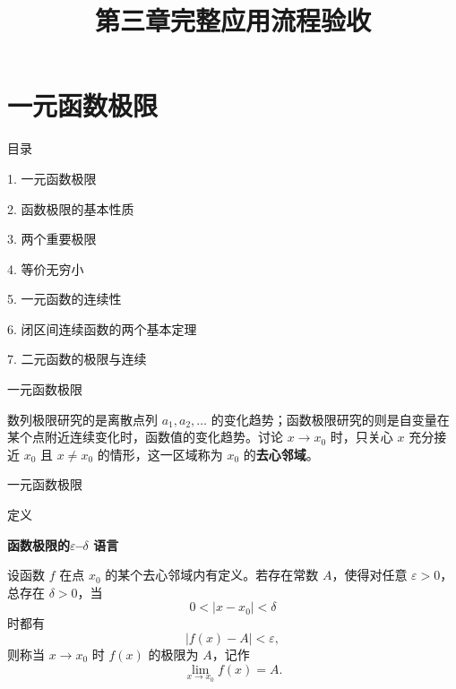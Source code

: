 \documentclass[aspectratio=169,10pt,fontset=fandol]{ctexbeamer}
\title{第三章完整应用流程验收}
\begin{document}
\section{一元函数极限}
\begin{frame}[t,fragile]{目录}
\normalsize
{\color{blue}\normalsize 1. 一元函数极限\par}\vspace{0.22em}
{\color{gray!40}\normalsize 2. 函数极限的基本性质\par}\vspace{0.22em}
{\color{gray!40}\normalsize 3. 两个重要极限\par}\vspace{0.22em}
{\color{gray!40}\normalsize 4. 等价无穷小\par}\vspace{0.22em}
{\color{gray!40}\normalsize 5. 一元函数的连续性\par}\vspace{0.22em}
{\color{gray!40}\normalsize 6. 闭区间连续函数的两个基本定理\par}\vspace{0.22em}
{\color{gray!40}\normalsize 7. 二元函数的极限与连续\par}\vspace{0.22em}
\end{frame}
\begin{frame}[t,fragile]{一元函数极限}
\normalsize
{\normalsize
数列极限研究的是离散点列 \(a_1,a_2,\ldots\) 的变化趋势；函数极限研究的则是自变量在某个点附近连续变化时，函数值的变化趋势。讨论 \(x\to x_0\) 时，只关心 \(x\) 充分接近 \(x_0\) 且 \(x\neq x_0\) 的情形，这一区域称为 \(x_0\) 的\textbf{去心邻域}。


}
\end{frame}
\begin{frame}[t,fragile]{一元函数极限}
\normalsize
\begin{block}{定义}
{\normalsize
\textbf{函数极限的\(\varepsilon\)--\(\delta\) 语言}\par

设函数 \(f\) 在点 \(x_0\) 的某个去心邻域内有定义。若存在常数 \(A\)，使得对任意 \(\varepsilon>0\)，总存在 \(\delta>0\)，当
\[
0<|x-x_0|<\delta
\]
时都有
\[
|f(x)-A|<\varepsilon,
\]
则称当 \(x\to x_0\) 时 \(f(x)\) 的极限为 \(A\)，记作
\[
\lim_{x\to x_0}f(x)=A.
\]

}
\end{block}
\end{frame}
\end{document}
